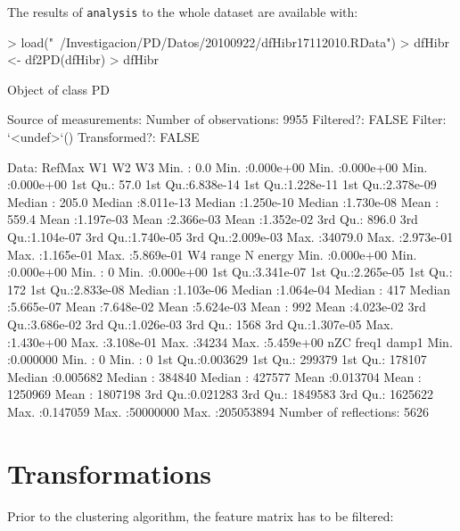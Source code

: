 \documentclass{article}
\renewenvironment{Schunk}{\begin{center}
    \scriptsize
    \begin{boxedminipage}{0.95\textwidth}}{
    \end{boxedminipage}\end{center}}
\begin{document}
The results of \texttt{analysis} to the whole dataset are available with:
\begin{Schunk}
\begin{Sinput}
> load("~/Investigacion/PD/Datos/20100922/dfHibr17112010.RData")
> dfHibr <- df2PD(dfHibr)
> dfHibr
\end{Sinput}
\begin{Soutput}
Object of class  PD 

Source of measurements:  
Number of observations:  9955 
Filtered?:  FALSE 
Filter: `<undef>`()
Transformed?: FALSE 

Data:
     RefMax              W1                  W2                  W3           
 Min.   :    0.0   Min.   :0.000e+00   Min.   :0.000e+00   Min.   :0.000e+00  
 1st Qu.:   57.0   1st Qu.:6.838e-14   1st Qu.:1.228e-11   1st Qu.:2.378e-09  
 Median :  205.0   Median :8.011e-13   Median :1.250e-10   Median :1.730e-08  
 Mean   :  559.4   Mean   :1.197e-03   Mean   :2.366e-03   Mean   :1.352e-02  
 3rd Qu.:  896.0   3rd Qu.:1.104e-07   3rd Qu.:1.740e-05   3rd Qu.:2.009e-03  
 Max.   :34079.0   Max.   :2.973e-01   Max.   :1.165e-01   Max.   :5.869e-01  
       W4                range                 N             energy         
 Min.   :0.000e+00   Min.   :0.000e+00   Min.   :    0   Min.   :0.000e+00  
 1st Qu.:3.341e-07   1st Qu.:2.265e-05   1st Qu.:  172   1st Qu.:2.833e-08  
 Median :1.103e-06   Median :1.064e-04   Median :  417   Median :5.665e-07  
 Mean   :7.648e-02   Mean   :5.624e-03   Mean   :  992   Mean   :4.023e-02  
 3rd Qu.:3.686e-02   3rd Qu.:1.026e-03   3rd Qu.: 1568   3rd Qu.:1.307e-05  
 Max.   :1.430e+00   Max.   :3.108e-01   Max.   :34234   Max.   :5.459e+00  
      nZC               freq1              damp1          
 Min.   :0.000000   Min.   :       0   Min.   :        0  
 1st Qu.:0.003629   1st Qu.:  299379   1st Qu.:   178107  
 Median :0.005682   Median :  384840   Median :   427577  
 Mean   :0.013704   Mean   : 1250969   Mean   :  1807198  
 3rd Qu.:0.021283   3rd Qu.: 1849583   3rd Qu.:  1625622  
 Max.   :0.147059   Max.   :50000000   Max.   :205053894  
Number of reflections:  5626 
\end{Soutput}
\end{Schunk}
\section{Transformations}
\label{sec:transform}

Prior to the clustering algorithm, the feature matrix has to be
filtered:
\end{document}

